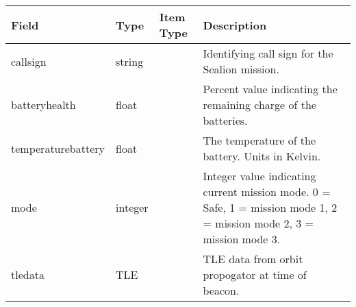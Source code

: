 
\begin{tabular}{ | m{3cm} | m{1cm}| m{1cm} | m{4cm} | } 
  \hline
  \textbf{Field} & \textbf{Type} & \textbf{Item Type} & \textbf{Description} \\
  \hline
  callsign & string &  & Identifying call sign for the Sealion mission. \\
  \hline
  batteryhealth & float &  & Percent value indicating the remaining charge of the batteries. \\
  \hline
  temperaturebattery & float &  & The temperature of the battery. Units in Kelvin. \\
  \hline
  mode & integer &  & Integer value indicating current mission mode. 0 = Safe, 1 = mission mode 1, 2 = mission mode 2, 3 = mission mode 3. \\
  \hline
  tledata & TLE &  & TLE data from orbit propogator at time of beacon. \\
  \hline
  
\end{tabular}

